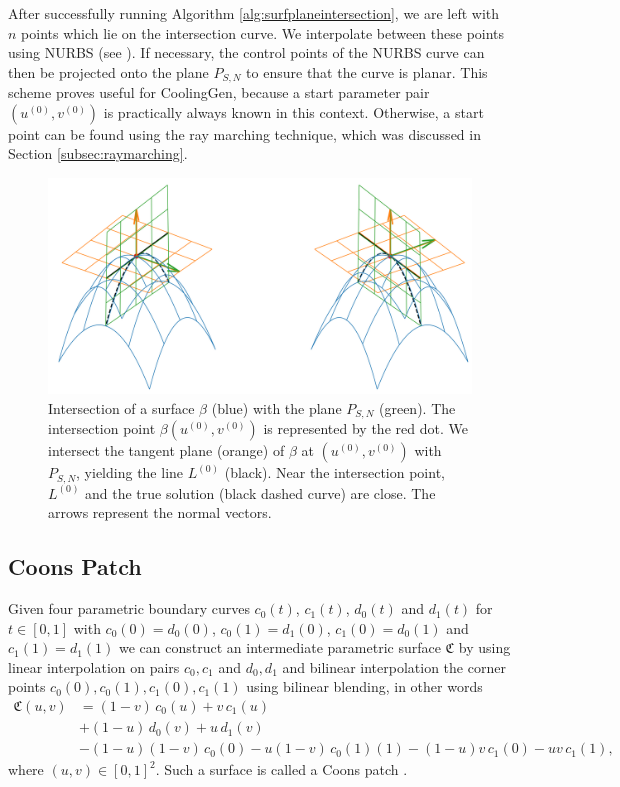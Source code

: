 \documentclass[a4paper, 11pt]{report}
\theoremstyle{definition}
\begin{document}
	After successfully running Algorithm \ref{alg:surfplaneintersection}, we are left with $n$ points which lie on the intersection curve. We interpolate between these points using NURBS (see \cite{Piegl1997}). If necessary, the control points of the NURBS curve can then be projected onto the plane $P_{S,N}$ to ensure that the curve is planar. This scheme proves useful for CoolingGen, because a start parameter pair $(u^{(0)}, v^{(0)})$ is practically always known in this context. Otherwise, a start point can be found using the ray marching technique, which was discussed in Section \ref{subsec:raymarching}.

	\begin{figure}[H]
		\centering
		\includegraphics[width=.8\textwidth]{../python/surfacePlaneIntersection2_cropped.png}
		\caption{Intersection of a surface $\beta$ (blue) with the plane $P_{S,N}$ (green). The intersection point $\beta(u^{(0)}, v^{(0)})$ is represented by the red dot. We intersect the tangent plane (orange) of $\beta$ at $(u^{(0)}, v^{(0)})$ with $P_{S,N}$, yielding the line $L^{(0)}$ (black). Near the intersection point, $L^{(0)}$ and the true solution (black dashed curve) are close. The arrows represent the normal vectors.}
		\label{fig:planeintersectionline}
	\end{figure}

\subsection{Coons Patch}
	Given four parametric boundary curves $c_0(t)$, $c_1(t)$, $d_0(t)$ and $d_1(t)$ for $t \in [0,1]$ with $c_0(0) = d_0(0)$, $c_0(1) = d_1(0)$, $c_1(0) = d_0(1)$ and $c_1(1) = d_1(1)$ we can construct an intermediate parametric surface $\mathfrak{C}$ by using linear interpolation on pairs $c_0, c_1$ and $d_0, d_1$ and bilinear interpolation the corner points $c_0(0), c_0(1), c_1(0), c_1(1)$ using bilinear blending, in other words
	\begin{align*}
		\mathfrak{C}(u,v) 	&= (1-v)\,c_0(u) + v\,c_1(u) \\
				&+ (1-u)\,d_0(v) + u\,d_1(v) \\
				&- (1-u)(1-v)\,c_0(0) - u(1-v)\,c_0(1)(1) - (1-u)v\,c_1(0) - uv\,c_1(1),
	\end{align*}
	where $(u,v) \in [0,1]^2$. Such a surface is called a Coons patch \cite{Coons1967}. 
\end{document}
